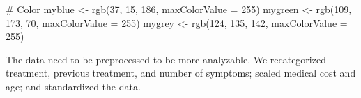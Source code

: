 \documentclass[
  letterpaper,
  DIV=11,
  numbers=noendperiod]{scrreprt}
\newenvironment{Shaded}{\begin{snugshade}}{\end{snugshade}}
\newcommand{\AttributeTok}[1]{\textcolor[rgb]{0.40,0.45,0.13}{#1}}
\newcommand{\CommentTok}[1]{\textcolor[rgb]{0.37,0.37,0.37}{#1}}
\newcommand{\DecValTok}[1]{\textcolor[rgb]{0.68,0.00,0.00}{#1}}
\newcommand{\FunctionTok}[1]{\textcolor[rgb]{0.28,0.35,0.67}{#1}}
\newcommand{\NormalTok}[1]{\textcolor[rgb]{0.00,0.23,0.31}{#1}}
\newcommand{\OtherTok}[1]{\textcolor[rgb]{0.00,0.23,0.31}{#1}}
\begin{document}
\begin{Shaded}
\begin{Highlighting}[]
\CommentTok{\# Color}
\NormalTok{myblue }\OtherTok{\textless{}{-}} \FunctionTok{rgb}\NormalTok{(}\DecValTok{37}\NormalTok{, }\DecValTok{15}\NormalTok{, }\DecValTok{186}\NormalTok{, }\AttributeTok{maxColorValue =} \DecValTok{255}\NormalTok{)}
\NormalTok{mygreen }\OtherTok{\textless{}{-}} \FunctionTok{rgb}\NormalTok{(}\DecValTok{109}\NormalTok{, }\DecValTok{173}\NormalTok{, }\DecValTok{70}\NormalTok{, }\AttributeTok{maxColorValue =} \DecValTok{255}\NormalTok{)}
\NormalTok{mygrey }\OtherTok{\textless{}{-}} \FunctionTok{rgb}\NormalTok{(}\DecValTok{124}\NormalTok{, }\DecValTok{135}\NormalTok{, }\DecValTok{142}\NormalTok{, }\AttributeTok{maxColorValue =} \DecValTok{255}\NormalTok{)}
\end{Highlighting}
\end{Shaded}

The data need to be preprocessed to be more analyzable. We recategorized
treatment, previous treatment, and number of symptoms; scaled medical
cost and age; and standardized the data.
\end{document}
